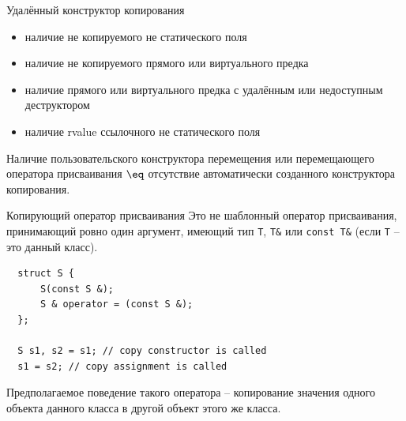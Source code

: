 \documentclass[unknownkeysallowed,xcolor=table]{beamer}
\begin{document}
\begin{frame}{Удалённый конструктор копирования}
  \begin{itemize}
    \item наличие не копируемого не статического поля \vspace{0.5em}
    \item наличие не копируемого прямого или виртуального предка \vspace{0.5em}
    \item наличие прямого или виртуального предка с удалённым или недоступным деструктором \vspace{0.5em}
    \item наличие rvalue ссылочного не статического поля
  \end{itemize}

  \vspace{1em}

  Наличие пользовательского конструктора перемещения или перемещающего оператора присваивания $\eq$ отсутствие автоматически созданного конструктора копирования.
\end{frame}

\begin{frame}[fragile]{Копирующий оператор присваивания}
  Это не шаблонный оператор присваивания, принимающий ровно один аргумент, имеющий тип \lstinline{T}, \lstinline{T&} или \lstinline{const T&} (если \lstinline{T} -- это данный класс).

  \vspace{1em}

  \begin{lstlisting}
  struct S {
      S(const S &);
      S & operator = (const S &);
  };

  S s1, s2 = s1; // copy constructor is called
  s1 = s2; // copy assignment is called
  \end{lstlisting}

  \vspace{1em}

  Предполагаемое поведение такого оператора -- копирование значения одного объекта данного класса в другой объект этого же класса.
\end{frame}
\end{document}
